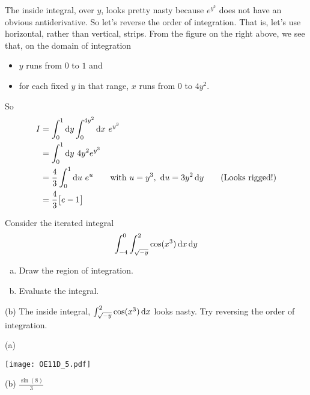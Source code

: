 \begin{solution}
The inside integral, over $y$, looks pretty nasty because $e^{y^3}$
does not have an obvious antiderivative. So let's reverse the order
of integration. That is, let's use horizontal, rather than vertical,
strips. From the figure on the right above, we see that, on the
domain of integration
\begin{itemize}
\item
$y$ runs from $0$ to $1$ and
\item 
for each fixed $y$ in that range, $x$ runs from $0$ to $4y^2$.
\end{itemize}
So 
\begin{align*}
I &= \int_0^1\mathrm{d}y\int_0^{4y^2}\mathrm{d}x\ e^{y^3} \\
  &= \int_0^1\mathrm{d}y\ 4y^2 e^{y^3} \\
  &= \frac{4}{3}\int_0^1\mathrm{d}u\ e^u \qquad\text{with }
                 u=y^3,\ \mathrm{d}u=3y^2\,\mathrm{d}y\qquad
                 \text{(Looks rigged!)}\\
  &=\frac{4}{3}\big[e-1\big]
\end{align*}
\end{solution}

\begin{question}[M200 2011D] %
Consider the iterated integral
\begin{equation*}
\int_{-4}^0\int_{\sqrt{-y}}^2 \cos(x^3)\,\mathrm{d}x\,\mathrm{d}y
\end{equation*}
\begin{enumerate}[(a)]
\item
Draw the region of integration.
\item
Evaluate the integral.
\end{enumerate}
\end{question}

\begin{hint}
(b) The inside integral, $\int_{\sqrt{-y}}^2 \cos(x^3)\,\mathrm{d}x$
looks nasty. Try reversing the order of integration.
\end{hint}

\begin{answer}
(a) 

\begin{center}
     \texttt{[image: OE11D\_5.pdf]}
\end{center}

(b) $\frac{\sin(8)}{3}$
\end{answer}

